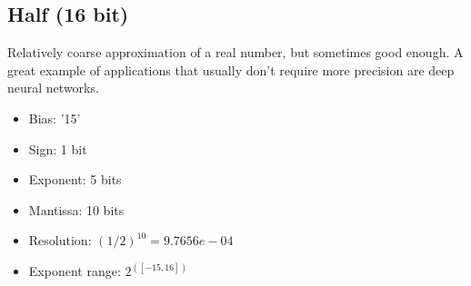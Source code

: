 \newpage

\subsection*{Half (16 bit)}

Relatively coarse approximation of a real number, but sometimes good enough. A great example of applications that usually don't require more precision are  deep neural networks.\autocite[]{wiki_half}

\begin{itemize}
    \item Bias: '15'
    \item Sign: 1 bit
    \item Exponent: 5 bits
    \item Mantissa: 10 bits
    \item Resolution: $ (1/2)^{10} = 9.7656e-04 $
    \item Exponent range: $ 2^{([-15,16])} $
\end{itemize}

\vspace{5mm}

\newpage